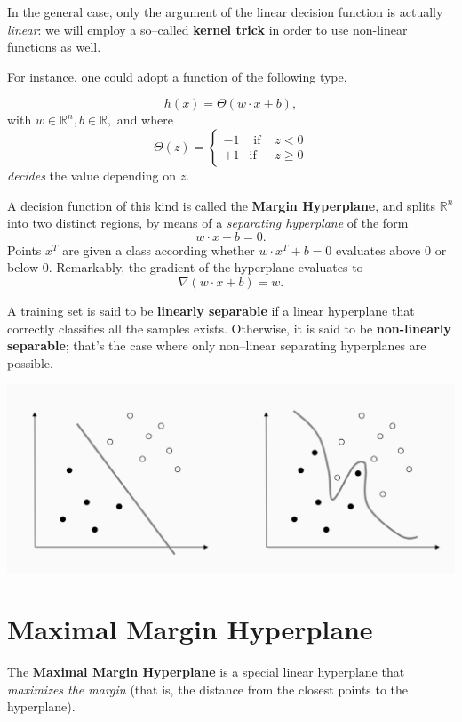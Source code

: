 \documentclass[10pt]{report}
\begin{document}
In the general case, only the argument of the linear decision function
is actually \emph{linear}: we will employ a so--called \textbf{kernel trick} in order to use
non-linear functions as well.

For instance, one could adopt a function of the following type,

\[h(x) = \Theta (w \cdot x + b),\] with
\(w \in \mathbb{R}^n, b \in \mathbb{R},\) and where
\[\Theta(z) = \left\{\begin{array}{lll} -1 & \mbox{ if } & z < 0\\ +1 & \mbox{if} & z \geq 0\end{array}\right.\]
\emph{decides} the value depending on \(z\).

A decision function of this kind is called the \textbf{Margin Hyperplane}, and
splits \(\mathbb{R}^n\) into two distinct regions, by means of a
\emph{separating hyperplane} of the form \[w \cdot x + b = 0.\] Points
\(x^T\) are given a class according whether \(w\cdot x^T + b = 0\)
evaluates above \(0\) or below \(0\). Remarkably, the gradient of the hyperplane
evaluates to \[\nabla (w \cdot x + b) = w.\]

A training set is said to be \textbf{linearly separable} if a linear hyperplane that
correctly classifies all the samples exists. Otherwise, it is said to be
\textbf{non-linearly separable}; that's the case where only non--linear separating
hyperplanes are possible.

\begin{center}
\includegraphics[width=.9\linewidth]{./pics/svm/linearly-separable.jpg}
\end{center}

\section{Maximal Margin Hyperplane}
\label{maximal-margin-hyperplane}
The \textbf{Maximal Margin Hyperplane} is a special linear hyperplane that \emph{maximizes the
margin} (that is, the distance from the closest points to the hyperplane).
\end{document}
